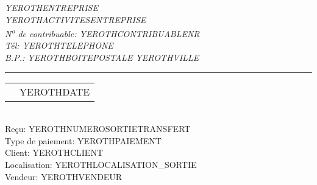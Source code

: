 \documentclass[1.75pt]{article} %
\makeatletter
\newcommand{\headerrow}[2]
{\begin{tabular*}{\linewidth}{l@{\extracolsep{\fill}}r}
	#1 &
	#2 \\
\end{tabular*}}
\makeatother
\begin{document}
\emph{YEROTHENTREPRISE} \\
\emph{YEROTHACTIVITESENTREPRISE} \\
\emph{N\textsuperscript{o} de contribuable: YEROTHCONTRIBUABLENR} \\
\emph{T\'el: YEROTHTELEPHONE} \\
\emph{B.P.: YEROTHBOITEPOSTALE YEROTHVILLE}

\vspace*{0.2cm}

\hrule

\headerrow
{}
{YEROTHDATE}\\

Re\c{c}u: YEROTHNUMEROSORTIETRANSFERT\\
Type de paiement: YEROTHPAIEMENT\\
Client: YEROTHCLIENT\\
Localisation: YEROTHLOCALISATION_SORTIE\\
Vendeur: YEROTHVENDEUR
\vspace*{0.2cm}

\end{document}
